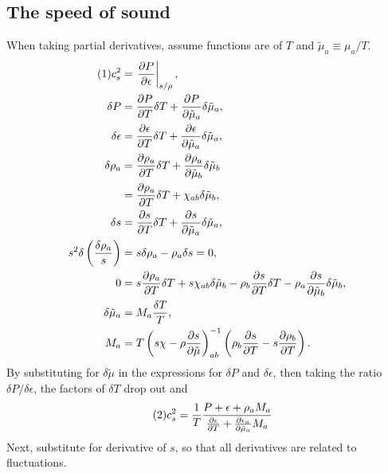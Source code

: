 \documentclass[12pt]{article}
\numberwithin{equation}{section}
\numberwithin{figure}{section}
\newcommand\eqnumber{\addtocounter{equation}{1}\tag{\theequation}}
\begin{document}
\subsection{The speed of sound}
When taking partial derivatives, assume functions are of $T$ and $\tilde{\mu}_a\equiv\mu_a/T$.
\begin{align*}\eqnumber
c_s^2&=\left.\frac{\partial P}{\partial\epsilon}\right|_{s/\rho},\\
\delta P&=\frac{\partial P}{\partial T}\delta T+\frac{\partial P}{\partial\tilde{\mu}_a}\delta\tilde{\mu}_a,\\
\delta \epsilon&=\frac{\partial\epsilon}{\partial T}\delta T+\frac{\partial\epsilon}{\partial\tilde{\mu}_a}\delta\tilde{\mu}_a,\\
\delta\rho_a&=\frac{\partial \rho_a}{\partial T}\delta T+\frac{\partial \rho_a}{\partial\tilde{\mu}_b}\delta\tilde{\mu}_b\\
&=\frac{\partial \rho_a}{\partial T}\delta T+\chi_{ab}\delta\tilde{\mu}_b,\\
\delta s&=\frac{\partial s}{\partial T}\delta T+\frac{\partial s}{\partial\tilde{\mu}_a}\delta\tilde{\mu}_a,\\
s^2\delta\left(\frac{\delta\rho_a}{s}\right)&=s\delta\rho_a-\rho_a\delta s=0,\\
0&=s\frac{\partial\rho_a}{\partial T}\delta T+s\chi_{ab}\delta\tilde{\mu}_b
-\rho_b\frac{\partial s}{\partial T}\delta T-\rho_a\frac{\partial s}{\partial\tilde{\mu}_b}\delta\tilde{\mu}_b,\\
\delta\tilde{\mu}_a&=M_a\frac{\delta T}{T},\\
M_a&=T\left(s\chi-\rho\frac{\partial s}{\partial\tilde{\mu}}\right)_{ab}^{-1}
\left(\rho_b\frac{\partial s}{\partial T}-s\frac{\partial\rho_b}{\partial T}\right).
\end{align*}
By substituting for $\delta\tilde{\mu}$ in the expressions for $\delta P$ and $\delta\epsilon$, then taking the ratio $\delta P/\delta\epsilon$, the factors of $\delta T$ drop out and
\begin{align*}\eqnumber
c_s^2&=\frac{1}{T}\frac{P+\epsilon+\rho_aM_a}{\frac{\partial\epsilon}{\partial T}+\frac{\partial\epsilon_a}{\partial\tilde{\mu}_a}M_a}
\end{align*}
Next, substitute for derivative of $s$, so that all derivatives are related to fluctuations.
\end{document}
